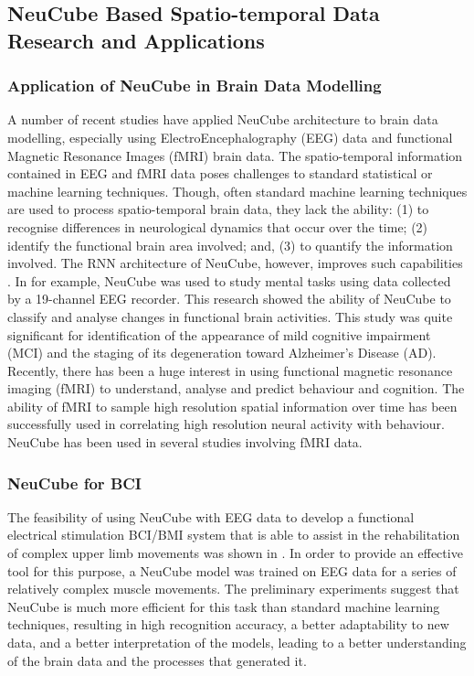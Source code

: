\subsection{NeuCube Based Spatio-temporal Data Research and Applications}
\label{sec:app}
\subsubsection{Application of NeuCube in Brain Data Modelling}

A number of recent studies have applied NeuCube architecture to brain data modelling, especially using ElectroEncephalography (EEG) data and functional Magnetic Resonance Images (fMRI) brain data. The spatio-temporal information contained in EEG and fMRI data poses challenges to standard statistical or machine learning techniques. Though, often standard machine learning techniques are used to process spatio-temporal brain data, they lack the ability: (1) to recognise differences in neurological dynamics that occur over the time; (2) identify the functional brain area involved; and, (3) to quantify the information involved. The RNN architecture of NeuCube, however, improves such capabilities \citep{taylor2014feasibility, hu2014eeg, kasabov2013dynamic}. In \citep{capecci2015analysis} for example, NeuCube was used to study mental tasks using data collected by a 19-channel EEG recorder. This research showed the ability of NeuCube to classify and analyse changes in functional brain activities. This study was quite significant for identification of the appearance of mild cognitive impairment (MCI) and the staging of its degeneration toward Alzheimer’s Disease (AD). Recently, there has been a huge interest in using functional magnetic resonance imaging (fMRI) to understand, analyse and predict behaviour and cognition. The ability of fMRI to sample high resolution spatial information over time has been successfully used in correlating high resolution neural activity with behaviour. NeuCube has been used in several studies \citep{doborjeh2014classification, kasabov2017mapping} involving fMRI data. 

\subsubsection{NeuCube for BCI}
The feasibility of using NeuCube with EEG data to develop a functional electrical stimulation BCI/BMI system that is able to assist in the rehabilitation of complex upper limb movements was shown in \citep{taylor2014feasibility}. In order to provide an effective tool for this purpose, a NeuCube model was trained on EEG data for a series of relatively complex muscle movements. The preliminary experiments suggest that NeuCube is much more efficient for this task than standard machine learning techniques, resulting in high recognition accuracy, a better adaptability to new data, and a better interpretation of the models, leading to a better understanding of the brain data and the processes that generated it.

